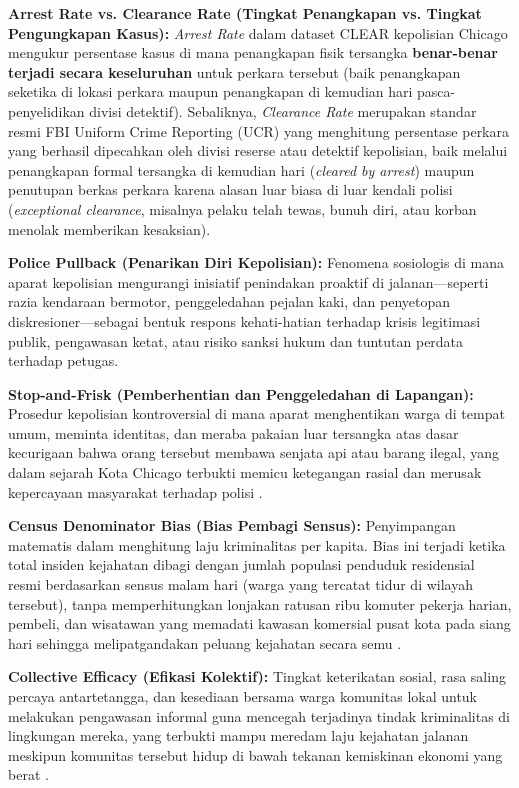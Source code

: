 \documentclass[11pt,a4paper]{article}
\begin{document}
\textbf{Arrest Rate vs. Clearance Rate (Tingkat Penangkapan vs. Tingkat Pengungkapan Kasus):} \textit{Arrest Rate} dalam dataset CLEAR kepolisian Chicago mengukur persentase kasus di mana penangkapan fisik tersangka \textbf{benar-benar terjadi secara keseluruhan} untuk perkara tersebut (baik penangkapan seketika di lokasi perkara maupun penangkapan di kemudian hari pasca-penyelidikan divisi detektif). Sebaliknya, \textit{Clearance Rate} merupakan standar resmi FBI Uniform Crime Reporting (UCR) yang menghitung persentase perkara yang berhasil dipecahkan oleh divisi reserse atau detektif kepolisian, baik melalui penangkapan formal tersangka di kemudian hari (\textit{cleared by arrest}) maupun penutupan berkas perkara karena alasan luar biasa di luar kendali polisi (\textit{exceptional clearance}, misalnya pelaku telah tewas, bunuh diri, atau korban menolak memberikan kesaksian).

\textbf{Police Pullback (Penarikan Diri Kepolisian):} Fenomena sosiologis di mana aparat kepolisian mengurangi inisiatif penindakan proaktif di jalanan---seperti razia kendaraan bermotor, penggeledahan pejalan kaki, dan penyetopan diskresioner---sebagai bentuk respons kehati-hatian terhadap krisis legitimasi publik, pengawasan ketat, atau risiko sanksi hukum dan tuntutan perdata terhadap petugas.

\textbf{Stop-and-Frisk (Pemberhentian dan Penggeledahan di Lapangan):} Prosedur kepolisian kontroversial di mana aparat menghentikan warga di tempat umum, meminta identitas, dan meraba pakaian luar tersangka atas dasar kecurigaan bahwa orang tersebut membawa senjata api atau barang ilegal, yang dalam sejarah Kota Chicago terbukti memicu ketegangan rasial dan merusak kepercayaan masyarakat terhadap polisi \cite{skogan2016}.

\textbf{Census Denominator Bias (Bias Pembagi Sensus):} Penyimpangan matematis dalam menghitung laju kriminalitas per kapita. Bias ini terjadi ketika total insiden kejahatan dibagi dengan jumlah populasi penduduk residensial resmi berdasarkan sensus malam hari (warga yang tercatat tidur di wilayah tersebut), tanpa memperhitungkan lonjakan ratusan ribu komuter pekerja harian, pembeli, dan wisatawan yang memadati kawasan komersial pusat kota pada siang hari sehingga melipatgandakan peluang kejahatan secara semu \cite{campedelli2020}.

\textbf{Collective Efficacy (Efikasi Kolektif):} Tingkat keterikatan sosial, rasa saling percaya antartetangga, dan kesediaan bersama warga komunitas lokal untuk melakukan pengawasan informal guna mencegah terjadinya tindak kriminalitas di lingkungan mereka, yang terbukti mampu meredam laju kejahatan jalanan meskipun komunitas tersebut hidup di bawah tekanan kemiskinan ekonomi yang berat \cite{campedelli2020}.
\end{document}
